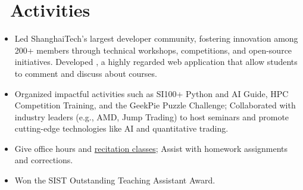 \documentclass{resume}
\begin{document}



\section{\faInfo\ Activities}


\begin{itemize}
  \item Led ShanghaiTech’s largest developer community, fostering innovation among 200+ members through technical workshops, competitions, and open-source initiatives. Developed , a highly regarded web application that allow students to comment and discuss about courses.
  \item Organized impactful activities such as SI100+ Python and AI Guide, HPC Competition Training, and the GeekPie Puzzle Challenge; Collaborated with industry leaders (e.g., AMD, Jump Trading) to host seminars and promote cutting-edge technologies like AI and quantitative trading.
\end{itemize}
\vspace{-0.7em}


\begin{itemize}
  \item Give office hours and \href{https://github.com/GKxxQAQ/CS100-recitations-spring2023}{recitation classes}; Assist with homework assignments and corrections.
  \item Won the SIST Outstanding Teaching Assistant Award.
\end{itemize}
\vspace{-0.7em}
\end{document}

